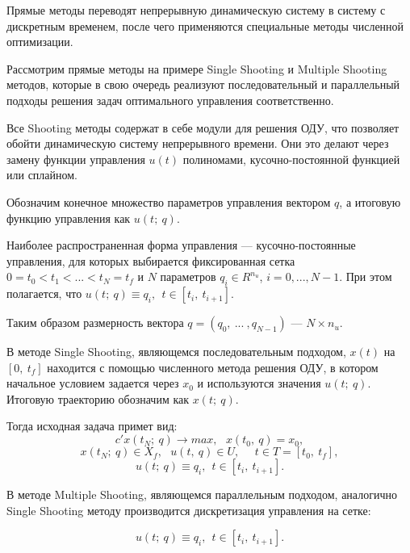 

Прямые методы переводят непрерывную динамическую систему в систему с дискретным временем, после чего применяются специальные методы численной оптимизации. 


Рассмотрим прямые методы на примере Single Shooting и Multiple Shooting методов, которые в свою очередь реализуют последовательный и параллельный подходы решения задач оптимального управления соответственно.


Все Shooting методы содержат в себе модули для решения ОДУ, что позволяет обойти динамическую систему непрерывного времени. Они это делают через замену функции управления $u(t)$ полиномами, кусочно-постоянной функцией или сплайном. 


Обозначим конечное множество параметров управления вектором $q$, а итоговую функцию управления как $u(t;~q)$.


Наиболее распространенная форма управления --- кусочно-постоянные управления, для которых выбирается фиксированная сетка $0 = t_0 < t_1 < ... < t_N = t_f$ и $N$ параметров $q_i \in R^{n_u}$, $i = 0,..., N - 1$. При этом полагается, что $u(t;~q) \equiv q_i, ~~ t \in [t_i,~t_{i+1}]$.


Таким образом размерность вектора $q = (q_0,~...~,q_{N-1})$ --- $N\times n_u$. 


В методе Single Shooting, являющемся последовательным подходом, $x(t)$ на $[0,~t_f]$ находится с помощью численного метода решения ОДУ, в котором начальное условием задается через $x_0$ и используются значения $u(t;~q)$. Итоговую траекторию обозначим как $x(t;~q)$. 


Тогда исходная задача примет вид:
\[c'x(t_N;~q) \to max,~~~x(t_0,~q) = x_0,\]
\[ x(t_N;~q) \in X_f,~~~u(t,~q) \in U, ~~~~~~t \in T = [t_0,~t_f],\]
\[u(t;~q) \equiv q_i, ~~ t \in [t_i,~t_{i+1}].\]


В методе Multiple Shooting, являющемся параллельным подходом, аналогично Single Shooting методу производится дискретизация управления на сетке:


\[u(t;~q) \equiv q_i, ~~ t \in [t_i,~t_{i+1}].\]


